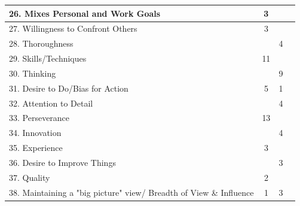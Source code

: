 \begin{table}[h!]
\begin{tabular}{|l|c|c|c|}
    26. Mixes Personal and Work Goals & 3 &  &  \\ \hline
    27. Willingness to Confront Others & 3 &  &  \\ \hline
    28. Thoroughness &  & 4 &  \\ \hline
    29. Skills/Techniques & 11 &  &  \\ \hline
    30. Thinking &  & 9 &  \\ \hline
    31. Desire to Do/Bias for Action & 5 & 1 &  \\ \hline
    32. Attention to Detail &  & 4 &  \\ \hline
    33. Perseverance & 13 &  &  \\ \hline
    34. Innovation &  & 4 &  \\ \hline
    35. Experience & 3 &  &  \\ \hline
    36. Desire to Improve Things &  & 3 &  \\ \hline
    37. Quality & 2 &  &  \\ \hline
    38. Maintaining a "big picture" view/ Breadth of View \& Influence & 1 & 3 &  \\ \hline
    \end{tabular}
\end{table}
